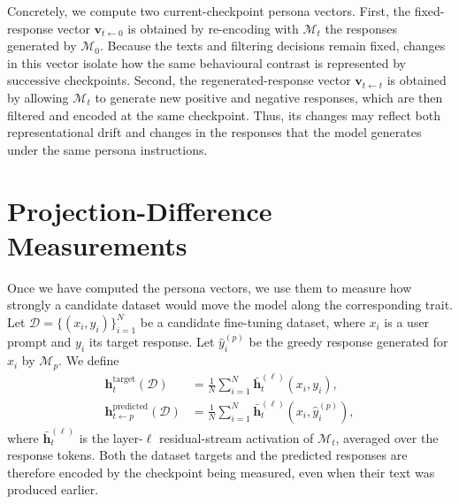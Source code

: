 Concretely, we compute two current-checkpoint persona vectors. First, the fixed-response vector $\mathbf{v}_{t\leftarrow0}$ is obtained by re-encoding with $\mathcal{M}_t$ the responses generated by $\mathcal{M}_0$. Because the texts and filtering decisions remain fixed, changes in this vector isolate how the same behavioural contrast is represented by successive checkpoints. Second, the regenerated-response vector $\mathbf{v}_{t\leftarrow t}$ is obtained by allowing $\mathcal{M}_t$ to generate new positive and negative responses, which are then filtered and encoded at the same checkpoint. Thus, its changes may reflect both representational drift and changes in the responses that the model generates under the same persona instructions.

\section{Projection-Difference Measurements}
\label{sec:deltap}
Once we have computed the persona vectors, we use them to measure how strongly a candidate dataset would move the model along the corresponding trait. Let $\mathcal{D}=\{(x_i,y_i)\}_{i=1}^{N}$ be a candidate fine-tuning dataset, where $x_i$ is a user prompt and $y_i$ its target response. Let $\widehat{y}^{(p)}_i$ be the greedy response generated for $x_i$ by $\mathcal{M}_p$. We define
\begin{align}
\mathbf{h}^{\text{target}}_{t}(\mathcal{D})
&=
\frac{1}{N}\sum_{i=1}^{N}
\bar{\mathbf{h}}^{(\ell)}_t(x_i,y_i),\\
\mathbf{h}^{\text{predicted}}_{t\leftarrow p}(\mathcal{D})
&=
\frac{1}{N}\sum_{i=1}^{N}
\bar{\mathbf{h}}^{(\ell)}_t(x_i,\widehat{y}^{(p)}_i),
\label{eq:deltap-activations}
\end{align}
where $\bar{\mathbf{h}}^{(\ell)}_t$ is the layer-$\ell$ residual-stream activation of $\mathcal{M}_t$, averaged over the response tokens. Both the dataset targets and the predicted responses are therefore encoded by the checkpoint being measured, even when their text was produced earlier.

